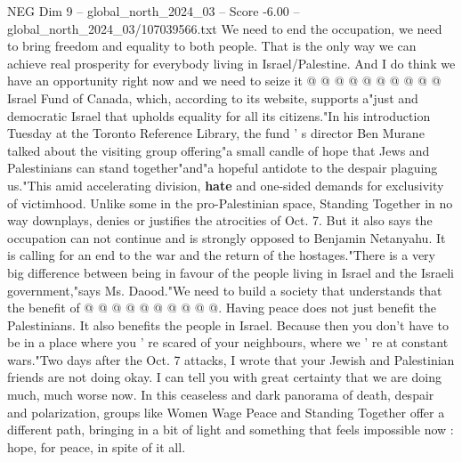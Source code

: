 \begin{textsample}{NEG Dim 9 – global\_north\_2024\_03 – Score -6.00 – global\_north\_2024\_03/107039566.txt}
We need to end the occupation, we need to bring freedom and equality to both people.
That is the only way we can achieve real prosperity for everybody living in Israel/Palestine.
And I do think we have an opportunity right now and we need to seize it @ @ @ @ @ @ @ @ @ @ Israel Fund of Canada, which, according to its website, supports a"just and democratic Israel that upholds equality for all its citizens."In his introduction Tuesday at the Toronto Reference Library, the fund ' s director Ben Murane talked about the visiting group offering"a small candle of hope that Jews and Palestinians can stand together"and"a hopeful antidote to the despair plaguing us."This amid accelerating division, \textbf{hate} and one-sided demands for exclusivity of victimhood.
Unlike some in the pro-Palestinian space, Standing Together in no way downplays, denies or justifies the atrocities of Oct. 7.
But it also says the occupation can not continue and is strongly opposed to Benjamin Netanyahu.
It is calling for an end to the war and the return of the hostages."There is a very big difference between being in favour of the people living in Israel and the Israeli government,"says Ms.
Daood."We need to build a society that understands that the benefit of @ @ @ @ @ @ @ @ @ @.
Having peace does not just benefit the Palestinians.
It also benefits the people in Israel.
Because then you don't have to be in a place where you ' re scared of your neighbours, where we ' re at constant wars."Two days after the Oct. 7 attacks, I wrote that your Jewish and Palestinian friends are not doing okay.
I can tell you with great certainty that we are doing much, much worse now.
In this ceaseless and dark panorama of death, despair and polarization, groups like Women Wage Peace and Standing Together offer a different path, bringing in a bit of light and something that feels impossible now : hope, for peace, in spite of it all.

\end{textsample}
